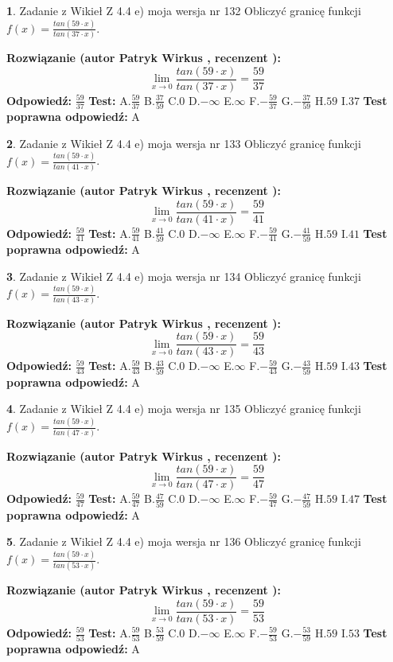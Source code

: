 \documentclass[12pt, a4paper]{article}
\theoremstyle{definition} %
\newtheorem{zad}{}
\newcommand{\zadStart}[1]{\begin{zad}#1\newline}
\newcommand{\zadStop}{\end{zad}}
\newcommand{\rozwStart}[2]{\noindent \textbf{Rozwiązanie (autor #1 , recenzent #2): }\newline}
\newcommand{\rozwStop}{\newline}
\newcommand{\odpStart}{\noindent \textbf{Odpowiedź:}\newline}
\newcommand{\odpStop}{\newline}
\newcommand{\testStart}{\noindent \textbf{Test:}\newline}
\newcommand{\testStop}{\newline}
\newcommand{\kluczStart}{\noindent \textbf{Test poprawna odpowiedź:}\newline}
\newcommand{\kluczStop}{\newline}
\begin{document}
\zadStart{Zadanie z Wikieł Z 4.4 e) moja wersja nr 132}
Obliczyć granicę funkcji $f(x)=\frac{tan(59\cdot x)}{tan(37\cdot x)}$.
\zadStop
\rozwStart{Patryk Wirkus}{}
$$\lim\limits_{x\to 0}\frac{tan(59\cdot x)}{tan(37\cdot x)}=
\frac{59}{37}$$
\rozwStop
\odpStart
$\frac{59}{37}$
\odpStop
\testStart
A.$\frac{59}{37}$
B.$\frac{37}{59}$
C.$0$
D.$-\infty$
E.$\infty$
F.$-\frac{59}{37}$
G.$-\frac{37}{59}$
H.$59$
I.$37$
\testStop
\kluczStart
A
\kluczStop



\zadStart{Zadanie z Wikieł Z 4.4 e) moja wersja nr 133}
Obliczyć granicę funkcji $f(x)=\frac{tan(59\cdot x)}{tan(41\cdot x)}$.
\zadStop
\rozwStart{Patryk Wirkus}{}
$$\lim\limits_{x\to 0}\frac{tan(59\cdot x)}{tan(41\cdot x)}=
\frac{59}{41}$$
\rozwStop
\odpStart
$\frac{59}{41}$
\odpStop
\testStart
A.$\frac{59}{41}$
B.$\frac{41}{59}$
C.$0$
D.$-\infty$
E.$\infty$
F.$-\frac{59}{41}$
G.$-\frac{41}{59}$
H.$59$
I.$41$
\testStop
\kluczStart
A
\kluczStop



\zadStart{Zadanie z Wikieł Z 4.4 e) moja wersja nr 134}
Obliczyć granicę funkcji $f(x)=\frac{tan(59\cdot x)}{tan(43\cdot x)}$.
\zadStop
\rozwStart{Patryk Wirkus}{}
$$\lim\limits_{x\to 0}\frac{tan(59\cdot x)}{tan(43\cdot x)}=
\frac{59}{43}$$
\rozwStop
\odpStart
$\frac{59}{43}$
\odpStop
\testStart
A.$\frac{59}{43}$
B.$\frac{43}{59}$
C.$0$
D.$-\infty$
E.$\infty$
F.$-\frac{59}{43}$
G.$-\frac{43}{59}$
H.$59$
I.$43$
\testStop
\kluczStart
A
\kluczStop



\zadStart{Zadanie z Wikieł Z 4.4 e) moja wersja nr 135}
Obliczyć granicę funkcji $f(x)=\frac{tan(59\cdot x)}{tan(47\cdot x)}$.
\zadStop
\rozwStart{Patryk Wirkus}{}
$$\lim\limits_{x\to 0}\frac{tan(59\cdot x)}{tan(47\cdot x)}=
\frac{59}{47}$$
\rozwStop
\odpStart
$\frac{59}{47}$
\odpStop
\testStart
A.$\frac{59}{47}$
B.$\frac{47}{59}$
C.$0$
D.$-\infty$
E.$\infty$
F.$-\frac{59}{47}$
G.$-\frac{47}{59}$
H.$59$
I.$47$
\testStop
\kluczStart
A
\kluczStop



\zadStart{Zadanie z Wikieł Z 4.4 e) moja wersja nr 136}
Obliczyć granicę funkcji $f(x)=\frac{tan(59\cdot x)}{tan(53\cdot x)}$.
\zadStop
\rozwStart{Patryk Wirkus}{}
$$\lim\limits_{x\to 0}\frac{tan(59\cdot x)}{tan(53\cdot x)}=
\frac{59}{53}$$
\rozwStop
\odpStart
$\frac{59}{53}$
\odpStop
\testStart
A.$\frac{59}{53}$
B.$\frac{53}{59}$
C.$0$
D.$-\infty$
E.$\infty$
F.$-\frac{59}{53}$
G.$-\frac{53}{59}$
H.$59$
I.$53$
\testStop
\kluczStart
A
\kluczStop
\end{document}
